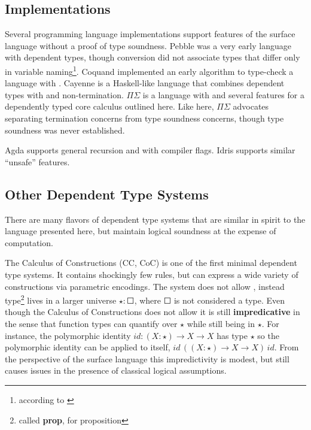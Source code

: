 \subsection{Implementations}
 
Several programming language implementations support features of the surface language without a proof of type soundness.
Pebble\cite{10.1007/3-540-13346-1_1} was a very early language with dependent types, though conversion did not associate types that differ only in variable naming\footnote{according to \cite{Reinhold89typecheckingis}}.
Coquand implemented an early \bidir{} algorithm to type-check a language with \tit{}\cite{COQUAND1996167}.
Cayenne\cite{10.1145/289423.289451} is a Haskell-like language that combines dependent types with \tit{} and non-termination.
$\Pi$$\Sigma$\cite{10.1007/978-3-642-12251-4_5} is a language with \tit{} and several features for a dependently typed core calculus outlined here.
Like here, $\Pi$$\Sigma$ advocates separating termination concerns from type soundness concerns, though type soundness was never established.
 
Agda supports general recursion and \tit{} with compiler flags.
Idris supports similar ``unsafe'' features.
 
\subsection{Other Dependent Type Systems}
 
There are many flavors of dependent type systems that are similar in spirit to the language presented here, but maintain logical soundness at the expense of computation.
 
The Calculus of Constructions (\ac{CC}, CoC)\cite{10.1016/0890-5401(88)90005-3} is one of the first minimal dependent type systems.
It contains shockingly few rules, but can express a wide variety of constructions via parametric encodings.
The system does not allow \tit{}, instead type\footnote{called \textbf{prop}, for proposition} lives in a larger universe $\star:\Square$, where $\Square$ is not considered a type.
Even though the Calculus of Constructions does not allow \tit{} it is still \textbf{impredicative} in the sense that function types can quantify over $\star$ while still being in $\star$.
For instance, the polymorphic identity $id:(X:\star)\rightarrow X\rightarrow X$ has type $\star$ so the polymorphic identity can be applied to itself, $id\,\left((X:\star)\rightarrow X\rightarrow X\right)\,id$.
From the perspective of the surface language this impredictivity is modest, but still causes issues in the presence of classical logical assumptions. 
 
